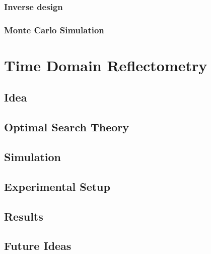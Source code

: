 \documentclass{article}
\begin{document}
\subsubsection{Inverse design}

\subsubsection{Monte Carlo Simulation}

\section{Time Domain Reflectometry}

\subsection{Idea}

\subsection{Optimal Search Theory}

\subsection{Simulation}

\subsection{Experimental Setup}

\subsection{Results}

\subsection{Future Ideas}
\end{document}
